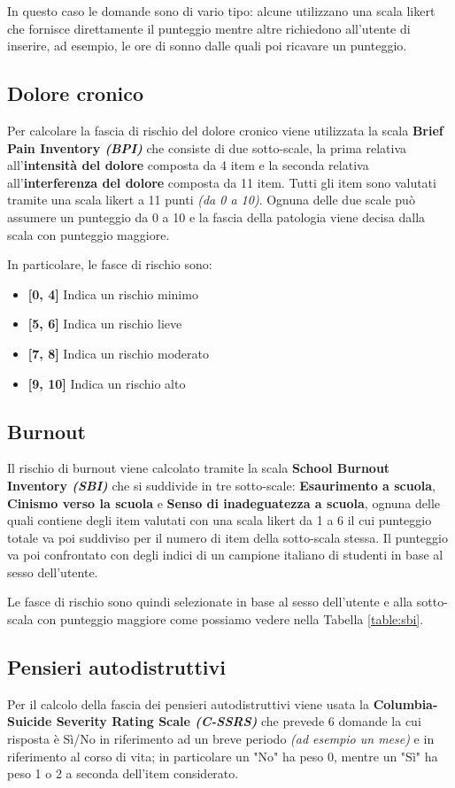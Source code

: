 In questo caso le domande sono di vario tipo: alcune utilizzano una scala likert che fornisce direttamente il punteggio mentre altre richiedono all'utente di inserire, ad esempio, le ore di sonno dalle quali poi ricavare un punteggio.

\subsection{Dolore cronico}
Per calcolare la fascia di rischio del dolore cronico viene utilizzata la scala \textbf{Brief Pain Inventory \textit{(BPI)}}\cite{BPI} che consiste di due sotto-scale, la prima relativa all'\textbf{intensità del dolore} composta da 4 item e la seconda relativa all'\textbf{interferenza del dolore} composta da 11 item. Tutti gli item sono valutati tramite una scala likert a 11 punti \textit{(da 0 a 10)}. Ognuna delle due scale può assumere un punteggio da 0 a 10 e la fascia della patologia viene decisa dalla scala con punteggio maggiore.

In particolare, le fasce di rischio sono:
\begin{itemize}
\item \textbf{[0, 4]} Indica un rischio minimo
\item \textbf{[5, 6]} Indica un rischio lieve
\item \textbf{[7, 8]} Indica un rischio moderato
\item \textbf{[9, 10]} Indica un rischio alto
\end{itemize}

\subsection{Burnout}
Il rischio di burnout viene calcolato tramite la scala \textbf{School Burnout Inventory \textit{(SBI)}}\cite{SBI} che si suddivide in tre sotto-scale: \textbf{Esaurimento a scuola}, \textbf{Cinismo verso la scuola} e  \textbf{Senso di inadeguatezza a scuola}, ognuna delle quali contiene degli item valutati con una scala likert da 1 a 6 il cui punteggio totale va poi suddiviso per il numero di item della sotto-scala stessa. Il punteggio va poi confrontato con degli indici di un campione italiano di studenti in base al sesso dell'utente.

Le fasce di rischio sono quindi selezionate in base al sesso dell'utente e alla sotto-scala con punteggio maggiore come possiamo vedere nella Tabella \ref{table:sbi}.


\newpage
\subsection{Pensieri autodistruttivi}
Per il calcolo della fascia dei pensieri autodistruttivi viene usata la \textbf{Columbia-Suicide Severity Rating Scale \textit{(C-SSRS)}}\cite{C-SSRS} che prevede 6 domande la cui risposta è Sì/No in riferimento ad un breve periodo \textit{(ad esempio un mese)} e in riferimento al corso di vita; in particolare un "No" ha peso 0, mentre un "Sì" ha peso 1 o 2 a seconda dell'item considerato.

